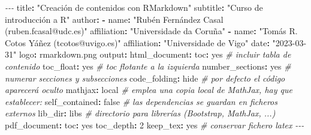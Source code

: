 \documentclass[
]{book}
\newenvironment{Shaded}{\begin{snugshade}}{\end{snugshade}}
\newcommand{\AttributeTok}[1]{\textcolor[rgb]{0.77,0.63,0.00}{#1}}
\newcommand{\CharTok}[1]{\textcolor[rgb]{0.31,0.60,0.02}{#1}}
\newcommand{\CommentTok}[1]{\textcolor[rgb]{0.56,0.35,0.01}{\textit{#1}}}
\newcommand{\DecValTok}[1]{\textcolor[rgb]{0.00,0.00,0.81}{#1}}
\newcommand{\FunctionTok}[1]{\textcolor[rgb]{0.00,0.00,0.00}{#1}}
\newcommand{\KeywordTok}[1]{\textcolor[rgb]{0.13,0.29,0.53}{\textbf{#1}}}
\newcommand{\PreprocessorTok}[1]{\textcolor[rgb]{0.56,0.35,0.01}{\textit{#1}}}
\newcommand{\StringTok}[1]{\textcolor[rgb]{0.31,0.60,0.02}{#1}}
\theoremstyle{break}
\theoremstyle{nonumberplain}
\begin{document}
\begin{Shaded}
\begin{Highlighting}[]
\PreprocessorTok{{-}{-}{-}}
\FunctionTok{title}\KeywordTok{:}\AttributeTok{ }\StringTok{"Creación de contenidos con RMarkdown"}
\FunctionTok{subtitle}\KeywordTok{:}\AttributeTok{ }\StringTok{"Curso de introducción a R"}
\FunctionTok{author}\KeywordTok{:}
\KeywordTok{{-}}\AttributeTok{ }\FunctionTok{name}\KeywordTok{:}\AttributeTok{ }\StringTok{"Rubén Fernández Casal (ruben.fcasal@udc.es)"}
\AttributeTok{  }\FunctionTok{affiliation}\KeywordTok{:}\AttributeTok{ }\StringTok{"Universidade da Coruña"}
\KeywordTok{{-}}\AttributeTok{ }\FunctionTok{name}\KeywordTok{:}\AttributeTok{ }\StringTok{"Tomás R. Cotos Yáñez (tcotos@uvigo.es)"}
\AttributeTok{  }\FunctionTok{affiliation}\KeywordTok{:}\AttributeTok{ }\StringTok{"Universidade de Vigo"}
\FunctionTok{date}\KeywordTok{:}\AttributeTok{ }\StringTok{"2023{-}03{-}31"}
\FunctionTok{logo}\KeywordTok{:}\AttributeTok{ rmarkdown.png}
\FunctionTok{output}\KeywordTok{:}
\AttributeTok{  }\FunctionTok{html\_document}\KeywordTok{:}
\AttributeTok{    }\FunctionTok{toc}\KeywordTok{:}\AttributeTok{ }\CharTok{yes}\CommentTok{                  \# incluir tabla de contenido}
\AttributeTok{    }\FunctionTok{toc\_float}\KeywordTok{:}\AttributeTok{ }\CharTok{yes}\CommentTok{            \# toc flotante a la izquierda}
\AttributeTok{    }\FunctionTok{number\_sections}\KeywordTok{:}\AttributeTok{ }\CharTok{yes}\CommentTok{      \# numerar secciones y subsecciones}
\AttributeTok{    }\FunctionTok{code\_folding}\KeywordTok{:}\AttributeTok{ hide}\CommentTok{        \# por defecto el código aparecerá oculto}
\AttributeTok{    }\FunctionTok{mathjax}\KeywordTok{:}\AttributeTok{ local}\CommentTok{            \# emplea una copia local de MathJax, hay que establecer:}
\AttributeTok{    }\FunctionTok{self\_contained}\KeywordTok{:}\AttributeTok{ }\CharTok{false}\CommentTok{     \# las dependencias se guardan en ficheros externos}
\AttributeTok{    }\FunctionTok{lib\_dir}\KeywordTok{:}\AttributeTok{ libs}\CommentTok{             \# directorio para librerías (Bootstrap, MathJax, ...)}
\AttributeTok{  }\FunctionTok{pdf\_document}\KeywordTok{:}
\AttributeTok{    }\FunctionTok{toc}\KeywordTok{:}\AttributeTok{ }\CharTok{yes}
\AttributeTok{    }\FunctionTok{toc\_depth}\KeywordTok{:}\AttributeTok{ }\DecValTok{2}
\AttributeTok{    }\FunctionTok{keep\_tex}\KeywordTok{:}\AttributeTok{ }\CharTok{yes}\CommentTok{             \# conservar fichero latex}
\PreprocessorTok{{-}{-}{-}}
\end{Highlighting}
\end{Shaded}
\end{document}
